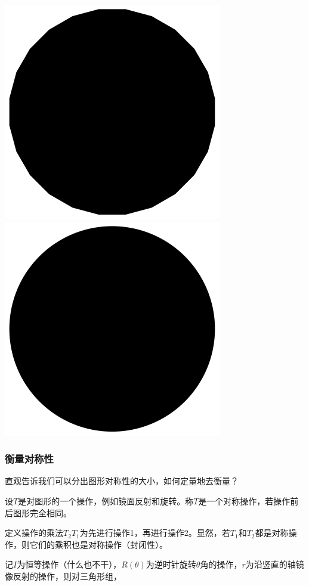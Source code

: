 \documentclass[CJK]{beamer}
\begin{document}
\begin{frame}
\begin{center}
\includegraphics[scale=0.15]{pol24}
\includegraphics[scale=0.15]{cir}
\end{center}

\ech
\end{frame}

\begin{frame}
\frametitle{\bch 衡量对称性 \ech}
\bch
直观告诉我们可以分出图形对称性的大小，如何定量地去衡量？
\par
设$T$是对图形的一个操作，例如镜面反射和旋转。称$T$是一个对称操作，若操作前后图形完全相同。
\par
定义操作的乘法$T_2 T_1$为先进行操作1，再进行操作2。显然，若$T_1$和$T_2$都是对称操作，则它们的乘积也是对称操作（封闭性）。
\par
记$I$为恒等操作（什么也不干），$R(\theta)$为逆时针旋转$\theta$角的操作，$r$为沿竖直的轴镜像反射的操作，则对三角形组，

\ech
\end{frame}
\end{document}
